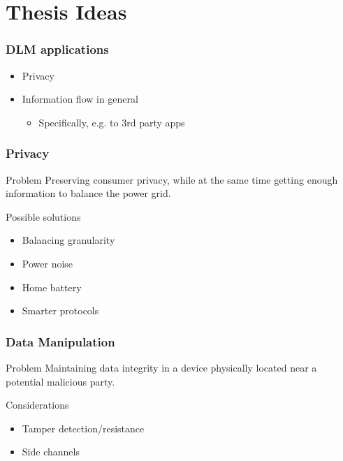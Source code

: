 
\section{Thesis Ideas}

\begin{frame}
  \frametitle{DLM applications}

  \begin{itemize}
    \item Privacy
    \item Information flow in general
    \begin{itemize}
      \item Specifically, e.g. to 3rd party apps
    \end{itemize}
  \end{itemize}
\end{frame}

\begin{frame}
  \frametitle{Privacy}

  \begin{block}{Problem}
    Preserving consumer privacy, while at the same time getting enough information to balance the power grid.
  \end{block}

  \begin{block}{Possible solutions}
    \begin{itemize}
      \item Balancing granularity
      \item Power noise
      \item Home battery
      \item Smarter protocols
    \end{itemize}
  \end{block}
\end{frame}

\begin{frame}
  \frametitle{Data Manipulation}

  \begin{block}{Problem}
    Maintaining data integrity in a device physically located near a potential malicious party.
  \end{block}

  \begin{block}{Considerations}
    \begin{itemize}
      \item Tamper detection/resistance
      \item Side channels
    \end{itemize}
  \end{block}
\end{frame}
